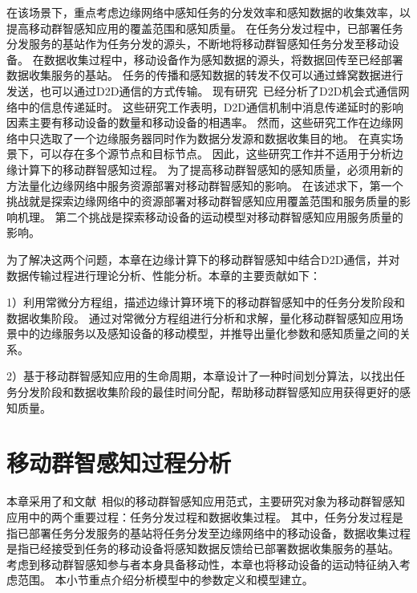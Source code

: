 在该场景下，重点考虑边缘网络中感知任务的分发效率和感知数据的收集效率，以提高移动群智感知应用的覆盖范围和感知质量。
在任务分发过程中，已部署任务分发服务的基站作为任务分发的源头，不断地将移动群智感知任务分发至移动设备。
在数据收集过程中，移动设备作为感知数据的源头，将数据回传至已经部署数据收集服务的基站。
任务的传播和感知数据的转发不仅可以通过蜂窝数据进行发送，也可以通过D2D通信的方式传输。
现有研究~\cite{DBLP:conf/wcnc/QinF13,DBLP:journals/twc/LiW14,DBLP:journals/winet/ZhaoMLT18}已经分析了D2D机会式通信网络中的信息传递延时。
这些研究工作表明，D2D通信机制中消息传递延时的影响因素主要有移动设备的数量和移动设备的相遇率。
然而，这些研究工作在边缘网络中只选取了一个边缘服务器同时作为数据分发源和数据收集目的地。
在真实场景下，可以存在多个源节点和目标节点。
因此，这些研究工作并不适用于分析边缘计算下的移动群智感知过程。
为了提高移动群智感知的感知质量，必须用新的方法量化边缘网络中服务资源部署对移动群智感知的影响。
在该述求下，第一个挑战就是探索边缘网络中的资源部署对移动群智感知应用覆盖范围和服务质量的影响机理。
第二个挑战是探索移动设备的运动模型对移动群智感知应用服务质量的影响。

为了解决这两个问题，本章在边缘计算下的移动群智感知中结合D2D通信，并对数据传输过程进行理论分析、性能分析。本章的主要贡献如下：

1）利用常微分方程组，描述边缘计算环境下的移动群智感知中的任务分发阶段和数据收集阶段。
通过对常微分方程组进行分析和求解，量化移动群智感知应用场景中的边缘服务以及感知设备的移动模型，并推导出量化参数和感知质量之间的关系。


2）基于移动群智感知应用的生命周期，本章设计了一种时间划分算法，以找出任务分发阶段和数据收集阶段的最佳时间分配，帮助移动群智感知应用获得更好的感知质量。


\section{移动群智感知过程分析}


本章采用了和文献~\cite{DBLP:journals/tpds/ZhaoMTL15}相似的移动群智感知应用范式，主要研究对象为移动群智感知应用中的两个重要过程：任务分发过程和数据收集过程。
其中，任务分发过程是指已部署任务分发服务的基站将任务分发至边缘网络中的移动设备，数据收集过程是指已经接受到任务的移动设备将感知数据反馈给已部署数据收集服务的基站。
考虑到移动群智感知参与者本身具备移动性，本章也将移动设备的运动特征纳入考虑范围。
本小节重点介绍分析模型中的参数定义和模型建立。


